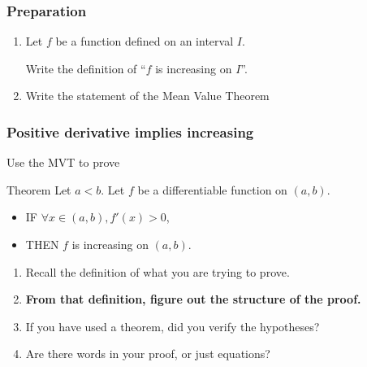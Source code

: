 \documentclass[14pt]{beamer}
\begin{document}
	\begin{frame}[t]
		\frametitle{Preparation}

		\begin{enumerate}
			\item Let $f$ be a function defined on an interval $I$.

				Write the definition of ``$f$ is increasing on $I$''.
				\vfill

			\item Write the statement of the Mean Value Theorem
				\vfill
		\end{enumerate}

	\end{frame}

	\begin{frame}[t]
		\frametitle{Positive derivative implies increasing}

		Use the MVT to prove

		\begin{block}{Theorem}
			Let $a < b$. Let $f$ be a differentiable function on $(a,b)$.
			\begin{itemize}
				\item IF $\forall x \in (a,b), f'(x) >0$,

				\item THEN $f$ is increasing on $(a,b)$.
			\end{itemize}
		\end{block}

		\pause

		\begin{enumerate}
			\item Recall the definition of what you are trying to prove.

			\item {\bf From that definition, figure out the structure of the proof.}

			\item If you have used a theorem, did you verify the hypotheses?

			\item Are there words in your proof, or just equations?
		\end{enumerate}
	\end{frame}
\end{document}
